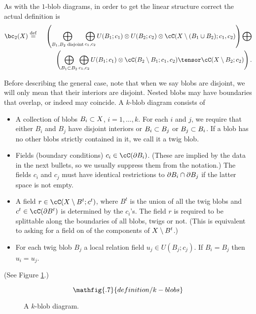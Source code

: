 As with the $1$-blob diagrams, in order to get the linear structure correct the actual definition is 
\begin{eqnarray*}
	\bc_2(X) & \deq &
	\left( 
		\bigoplus_{B_1, B_2\; \text{disjoint}} \bigoplus_{c_1, c_2}
			U(B_1; c_1) \otimes U(B_2; c_2) \otimes \lf(X\setmin (B_1\cup B_2); c_1, c_2)
	\right)  \bigoplus \\
	&& \quad\quad  \left( 
		\bigoplus_{B_1 \subset B_2} \bigoplus_{c_1, c_2}
			U(B_1; c_1) \otimes \lf(B_2 \setmin B_1; c_1, c_2) \tensor \cC(X \setminus B_2; c_2)
	\right) .
\end{eqnarray*}




Before describing the general case, note that when we say blobs are disjoint, we will only mean that their interiors are disjoint. Nested blobs may have boundaries that overlap, or indeed may coincide.
A $k$-blob diagram consists of
\begin{itemize}
\item A collection of blobs $B_i \subset X$, $i = 1, \ldots, k$.
For each $i$ and $j$, we require that either $B_i$ and $B_j$ have disjoint interiors or
$B_i \subset B_j$ or $B_j \subset B_i$.
If a blob has no other blobs strictly contained in it, we call it a twig blob.
\item Fields (boundary conditions) $c_i \in \cC(\bd B_i)$.
(These are implied by the data in the next bullets, so we usually
suppress them from the notation.)
The fields $c_i$ and $c_j$ must have identical restrictions to $\partial B_i \cap \partial B_j$
if the latter space is not empty.
\item A field $r \in \cC(X \setmin B^t; c^t)$,
where $B^t$ is the union of all the twig blobs and $c^t \in \cC(\bd B^t)$
is determined by the $c_i$'s.
The field $r$ is required to be splittable along the boundaries of all blobs, twigs or not. (This is equivalent to asking for a field on of the components of $X \setminus B^t$.)
\item For each twig blob $B_j$ a local relation field $u_j \in U(B_j; c_j)$.
If $B_i = B_j$ then $u_i = u_j$.
\end{itemize}
(See Figure \ref{blobkdiagram}.)
\begin{figure}[t]\begin{equation*}
\mathfig{.7}{definition/k-blobs}
\end{equation*}\caption{A $k$-blob diagram.}\label{blobkdiagram}\end{figure}

